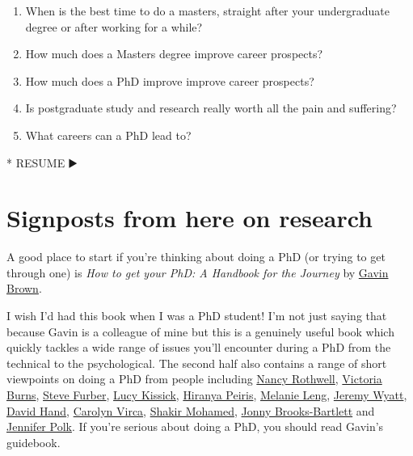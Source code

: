 \documentclass[
]{book}
\newenvironment{Shaded}{\begin{snugshade}}{\end{snugshade}}
\newcommand{\NormalTok}[1]{#1}
\newcommand{\SpecialStringTok}[1]{\textcolor[rgb]{0.31,0.60,0.02}{#1}}
\providecommand{\tightlist}{%
  \setlength{\itemsep}{0pt}\setlength{\parskip}{0pt}}
\begin{document}
\begin{enumerate}
\def\labelenumi{\arabic{enumi}.}
\tightlist
\item
  When is the best time to do a masters, straight after your undergraduate degree or after working for a while?
\item
  How much does a Masters degree improve career prospects?
\item
  How much does a PhD improve improve career prospects?
\item
  Is postgraduate study and research really worth all the pain and suffering?
\item
  What careers can a PhD lead to?
\end{enumerate}

\begin{Shaded}
\begin{Highlighting}[]
\SpecialStringTok{* }\NormalTok{RESUME ▶️}
\end{Highlighting}
\end{Shaded}

\hypertarget{rsignposts}{%
\section{Signposts from here on research}\label{rsignposts}}

A good place to start if you're thinking about doing a PhD (or trying to get through one) is \emph{How to get your PhD: A Handbook for the Journey} by \href{https://twitter.com/profgavinbrown}{Gavin Brown}. \citep{howtogetyourphd}

I wish I'd had this book when I was a PhD student! I'm not just saying that because Gavin is a colleague of mine but this is a genuinely useful book which quickly tackles a wide range of issues you'll encounter during a PhD from the technical to the psychological. The second half also contains a range of short viewpoints on doing a PhD from people including \href{https://en.wikipedia.org/wiki/Nancy_Rothwell}{Nancy Rothwell}, \href{https://twitter.com/drvikkiburns}{Victoria Burns}, \href{https://en.wikipedia.org/wiki/Steve_Furber}{Steve Furber}, \href{https://www.lucykissick.co.uk/}{Lucy Kissick}, \href{https://en.wikipedia.org/wiki/Hiranya_Peiris}{Hiranya Peiris}, \href{https://en.wikipedia.org/wiki/Melanie_Leng}{Melanie Leng}, \href{https://www.cs.bham.ac.uk/~jlw/}{Jeremy Wyatt}, \href{https://en.wikipedia.org/wiki/David_Hand_(statistician)}{David Hand}, \href{https://www.linkedin.com/in/carolyn-virca-3446b558/}{Carolyn Virca}, \href{https://shakirm.com/}{Shakir Mohamed}, \href{https://medium.com/@jonnybrooks04}{Jonny Brooks-Bartlett} and \href{https://fromphdtolife.com/}{Jennifer Polk}. If you're serious about doing a PhD, you should read Gavin's guidebook.
\end{document}
